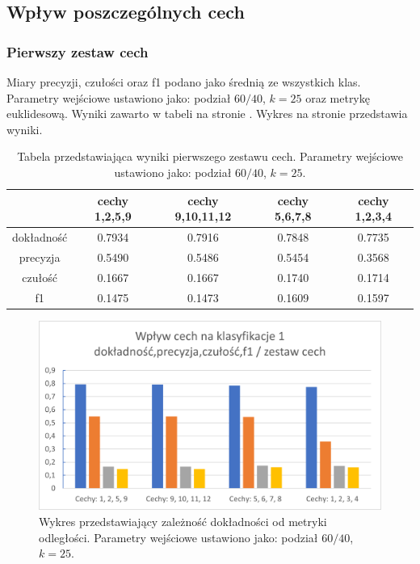 \documentclass{classrep}
\begin{document}
\subsection{Wpływ poszczególnych cech}


\subsubsection{Pierwszy zestaw cech}
Miary precyzji, czułości oraz f1 podano jako średnią ze wszystkich klas. Parametry wejściowe ustawiono jako: podział $60/40$, $k=25$ oraz metrykę euklidesową. Wyniki zawarto w tabeli na stronie \pageref{tf1}. Wykres na stronie \pageref{features_set_1} przedstawia wyniki.


\begin{table}
\label{tf1}
\begin{tabular}{|c|c|c|c|c|}
\hline  & cechy 1,2,5,9 & cechy 9,10,11,12 & cechy 5,6,7,8 & cechy 1,2,3,4 \\
\hline \hline
dokładność & 0.7934 & 0.7916 & 0.7848 & 0.7735\\
precyzja & 0.5490 & 0.5486 & 0.5454 & 0.3568 \\
czułość & 0.1667 & 0.1667 & 0.1740 & 0.1714\\
f1 & 0.1475 & 0.1473 & 0.1609 & 0.1597 \\
\end{tabular}
\caption{Tabela przedstawiająca wyniki pierwszego zestawu cech. Parametry wejściowe ustawiono jako: podział $60/40$, $k=25$.}
\end{table}

\begin{figure}
\label{features_set_1}
\includegraphics[scale=1]{features_set_1}
\caption{Wykres przedstawiający zależność dokładności od metryki odległości. Parametry wejściowe ustawiono jako: podział $60/40$, $k=25$.}
\end{figure}
\end{document}
